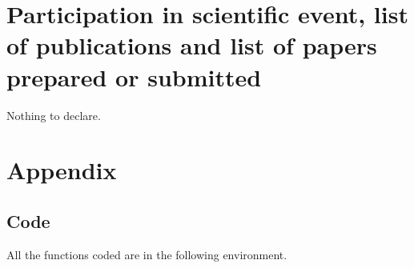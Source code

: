 \documentclass[letterpaper,10pt,english]{jupyterBook}
\begin{document}
\sphinxstepscope


\chapter{Participation in scientific event, list of publications and list of papers prepared or submitted}
\label{\detokenize{Participation_in_scientific_event,_list_of_publications_and_list_of_papers_prepared_or_submitted:participation-in-scientific-event-list-of-publications-and-list-of-papers-prepared-or-submitted}}\label{\detokenize{Participation_in_scientific_event,_list_of_publications_and_list_of_papers_prepared_or_submitted::doc}}
\sphinxAtStartPar
Nothing to declare.

\sphinxstepscope


\chapter{Appendix}
\label{\detokenize{appendix:appendix}}\label{\detokenize{appendix::doc}}

\section{Code}
\label{\detokenize{appendix:code}}
\sphinxAtStartPar
All the functions coded are in the following environment.
\end{document}
